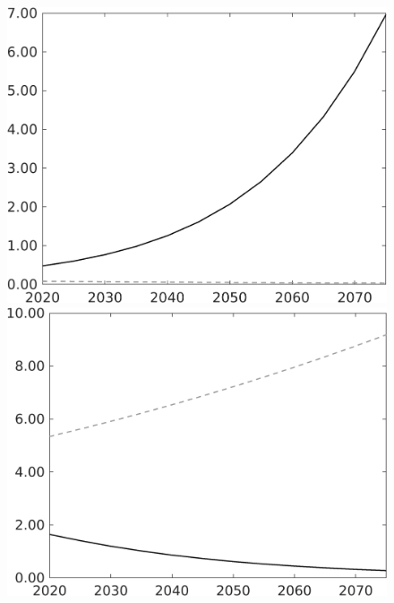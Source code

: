 \documentclass[12pt]{article}
\begin{document}
\begin{figure}[h!!]
\begin{minipage}[]{0.32\textwidth}
	\end{minipage}	
	\begin{minipage}[]{0.32\textwidth}
		\includegraphics[width=1\textwidth]{../../codding_model/own_basedOnFried/optimalPol_010922_revision/figures/all_13Sept22/LevTaufNoTauf_TaulCalib_Equlab_regime0_GFF_spillover0_nsk1_xgr0_knspil1_sep1_LFlimit0_emsbase0_countec0_GovRev0_etaa0.79_lgd0.png}
	\end{minipage}	
	\begin{minipage}[]{0.32\textwidth}
		\includegraphics[width=1\textwidth]{../../codding_model/own_basedOnFried/optimalPol_010922_revision/figures/all_13Sept22/LevTaufNoTauf_TaulCalib_Equlab_regime0_pgpftf_spillover0_nsk1_xgr0_knspil1_sep1_LFlimit0_emsbase0_countec0_GovRev0_etaa0.79_lgd0.png}

\end{minipage}
\end{figure}
\end{document}
